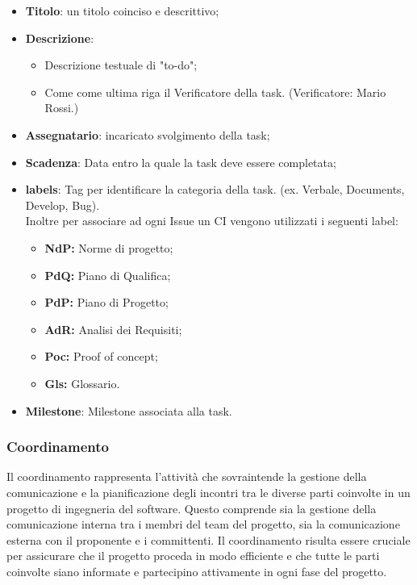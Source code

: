 \documentclass{article}
\begin{document}
\begin{itemize}
    \item \textbf{Titolo}: un titolo coinciso e descrittivo;
    \item \textbf{Descrizione}:
    \begin{itemize}
        \item Descrizione testuale di "to-do";
        \item Come come ultima riga il Verificatore della task. (Verificatore: Mario Rossi.)
    \end{itemize} 
    \item \textbf{Assegnatario}: incaricato svolgimento della task;
    \item \textbf{Scadenza}: Data entro la quale la task deve essere completata;
    \item \textbf{labels}: Tag per identificare la categoria della task. (ex. Verbale, Documents, Develop, Bug).\\ Inoltre per associare ad ogni Issue un CI vengono utilizzati i seguenti label:
    \begin{itemize}
        \item \textbf{NdP:} Norme di progetto;
        \item \textbf{PdQ:} Piano di Qualifica;
        \item \textbf{PdP:} Piano di Progetto;
        \item \textbf{AdR:} Analisi dei Requisiti;
        \item \textbf{Poc:} Proof of concept;
        \item \textbf{Gls:} Glossario.
    \end{itemize}
    \item \textbf{Milestone}: Milestone associata alla task.
\end{itemize}

\subsubsection{Coordinamento}
Il coordinamento rappresenta l'attività che sovraintende la gestione della comunicazione e la pianificazione degli incontri tra le diverse parti coinvolte in un progetto di ingegneria del software. Questo comprende sia la gestione della comunicazione interna tra i membri del team del progetto, sia la comunicazione esterna con il proponente e i committenti. Il coordinamento risulta essere cruciale per assicurare che il progetto proceda in modo efficiente e che tutte le parti coinvolte siano informate e partecipino attivamente in ogni fase del progetto.
\end{document}
